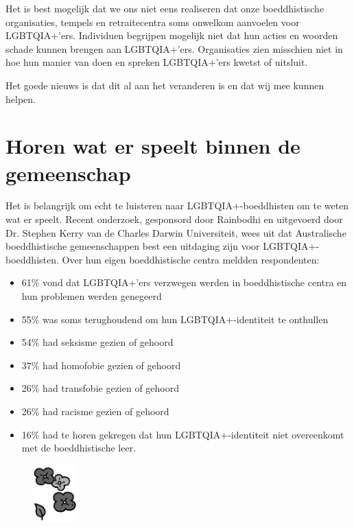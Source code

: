 \documentclass[12pt,openany]{book}
\begin{document}
Het is best mogelijk dat we ons niet eens realiseren dat onze boeddhistische organisaties, tempels en retraitecentra soms onwelkom aanvoelen voor LGBTQIA+’ers. Individuen begrijpen mogelijk niet dat hun acties en woorden schade kunnen brengen aan LGBTQIA+’ers. Organisaties zien misschien niet in hoe hun manier van doen en spreken LGBTQIA+’ers kwetst of uitsluit.  

Het goede nieuws is dat dit al aan het veranderen is en dat wij mee kunnen helpen.

\section*{Horen wat er speelt binnen de gemeenschap}

Het is belangrijk om echt te luisteren naar LGBTQIA+-boeddhisten om te weten wat er speelt. Recent onderzoek, gesponsord door Rainbodhi en uitgevoerd door Dr. Stephen Kerry van de Charles Darwin Universiteit, wees uit dat Australische boeddhistische gemeenschappen best een uitdaging zijn voor LGBTQIA+-boeddhisten. Over hun eigen boeddhistische centra meldden respondenten:

\begin{itemize}
  \setlength\itemsep{0em}
  \item 61\% vond dat LGBTQIA+’ers verzwegen werden in boeddhistische centra en hun problemen werden genegeerd
  \item 55\% was soms terughoudend om hun LGBTQIA+-identiteit te onthullen
  \item 54\% had seksisme gezien of gehoord
  \item 37\% had homofobie gezien of gehoord
  \item 26\% had transfobie gezien of gehoord
  \item 26\% had racisme gezien of gehoord
  \item 16\% had te horen gekregen dat hun LGBTQIA+-identiteit niet overeenkomt met de boeddhistische leer.
\end{itemize}

\begin{figure}
    \centering
    \includegraphics[width=0.15\textwidth]{2bw4.png}
\end{figure}
\end{document}
